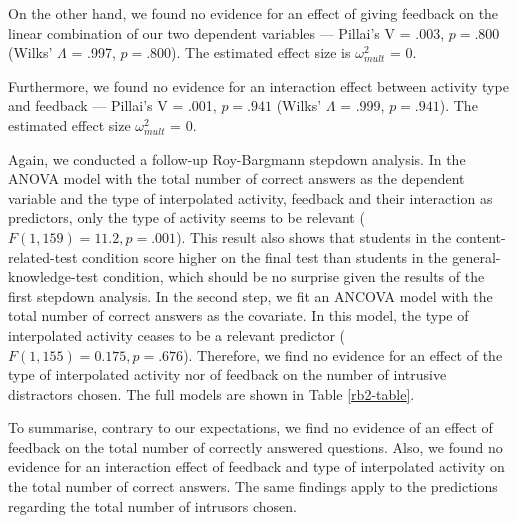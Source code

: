 On the other hand, we found no evidence for an effect of giving feedback
on the linear combination of our two dependent variables --- Pillai's V
= .003, \(p = .800\) (Wilks' \(\Lambda\) = .997, \(p = .800\)). The
estimated effect size is \(\omega^2_{mult}\) = 0.

Furthermore, we found no evidence for an interaction effect between
activity type and feedback --- Pillai's V = .001, \(p = .941\) (Wilks'
\(\Lambda\) = .999, \(p = .941\)). The estimated effect size
\(\omega^2_{mult}\) = 0.

Again, we conducted a follow-up Roy-Bargmann stepdown analysis. In the
ANOVA model with the total number of correct answers as the dependent
variable and the type of interpolated activity, feedback and their
interaction as predictors, only the type of activity seems to be
relevant (\(F(1, 159) = 11.2, p = .001\)). This result also shows that
students in the content-related-test condition score higher on the final
test than students in the general-knowledge-test condition, which should
be no surprise given the results of the first stepdown analysis. In the
second step, we fit an ANCOVA model with the total number of correct
answers as the covariate. In this model, the type of interpolated
activity ceases to be a relevant predictor
(\(F(1, 155) = 0.175, p = .676\)). Therefore, we find no evidence for an
effect of the type of interpolated activity nor of feedback on the
number of intrusive distractors chosen. The full models are shown in
Table \ref{rb2-table}.

To summarise, contrary to our expectations, we find no evidence of an
effect of feedback on the total number of correctly answered questions.
Also, we found no evidence for an interaction effect of feedback and
type of interpolated activity on the total number of correct answers.
The same findings apply to the predictions regarding the total number of
intrusors chosen.


